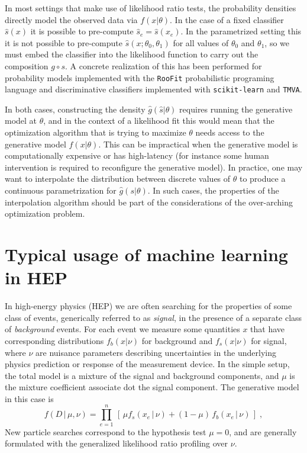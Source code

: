 \documentclass[11pt, oneside]{article}   	%
\begin{document}
In most settings that make use of likelihood ratio tests, the probability densities directly model the observed data via $f(x|\theta)$. In the case of a fixed classifier $\hat s(x)$ it is possible to pre-compute $\hat s_e=\hat s(x_e)$. In the parametrized setting this it is not possible to pre-compute $\hat s(x; \theta_0, \theta_1)$ for all values of $\theta_0$ and $\theta_1$, so  we must embed the classifier into the likelihood function to carry out the composition $g\circ s$. A concrete realization of this has been performed for probability models implemented with the \texttt{RooFit} probabilistic programing language and discriminative classifiers implemented with \texttt{scikit-learn} and \texttt{TMVA}.

In both cases, constructing the density $\hat g(\hat s|\theta)$ requires running the generative model at $\theta$, and in the context of a likelihood fit this would mean that the optimization algorithm that is trying to maximize $\theta$ needs access to the generative model $f(x|\theta)$. This can be  impractical when the generative model is computationally expensive or has high-latency (for instance some human intervention is required to reconfigure the generative model).  In practice, one may want to interpolate the distribution between discrete values of $\theta$ to produce a continuous parametrization for $\hat g(s | \theta)$. In such cases, the properties of the interpolation algorithm should be part of the considerations of the over-arching optimization problem.

\section{Typical usage of machine learning in HEP}

In high-energy physics (HEP) we are often searching for the properties of some 
class of events, generically referred to as \textit{signal}, in the presence of a separate class 
of \textit{background} events. For each event we measure some quantities $x$ that have corresponding distributions 
$f_b(x|\nu)$ for background and $f_s(x|\nu)$ for signal, where $\nu$ are nuisance parameters describing 
uncertainties in the underlying physics prediction or response of the measurement device. In the simple setup, the 
total model is a mixture of the signal and background components, and $\mu$ is the mixture coefficient associate 
dot the signal component. The generative model in this case is
\begin{equation}\label{eq:hepGen}
f( D \,|\, \mu, \nu) = \prod_{e=1}^n \, \left[\, \mu f_s( x_e \, |\,  \nu)  + (1-\mu)\, f_b( x_e \,|\, \nu) \,\right] \; ,
\end{equation}
New particle searches correspond to the hypothesis test $\mu=0$, and are generally formulated with the
generalized likelihood ratio profiling over $\nu$.
\end{document}
